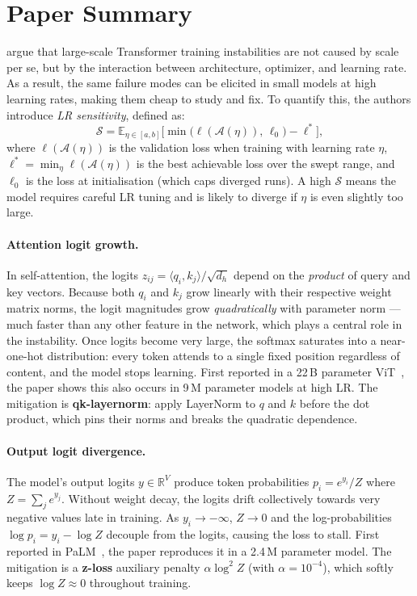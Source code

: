 \section{Paper Summary}
\label{sec:summary}

\citeauthor{wortsman2023smallscale} argue that large-scale Transformer
training instabilities are not caused by scale per se, but by the interaction
between architecture, optimizer, and learning rate.
As a result, the same failure modes can be elicited in small models at high
learning rates, making them cheap to study and fix.
To quantify this, the authors introduce \emph{LR sensitivity}, defined as:
\begin{equation}
  \mathcal{S} = \mathbb{E}_{\eta \in [a,b]}\bigl[
    \min\!\bigl(\ell(\mathcal{A}(\eta)),\, \ell_0\bigr) - \ell^*
  \bigr],
  \label{eq:lr_sensitivity}
\end{equation}
where $\ell(\mathcal{A}(\eta))$ is the validation loss when training with
learning rate $\eta$, $\ell^* = \min_\eta \ell(\mathcal{A}(\eta))$ is the
best achievable loss over the swept range, and $\ell_0$ is the loss at
initialisation (which caps diverged runs).
A high $\mathcal{S}$ means the model requires careful LR tuning and is likely
to diverge if $\eta$ is even slightly too large.

\paragraph{Attention logit growth.}
In self-attention, the logits $z_{ij} = \langle q_i, k_j\rangle / \sqrt{d_h}$
depend on the \emph{product} of query and key vectors.
Because both $q_i$ and $k_j$ grow linearly with their respective weight matrix
norms, the logit magnitudes grow \emph{quadratically} with parameter norm ---
much faster than any other feature in the network, which plays a central role in the instability.
Once logits become very large, the softmax saturates into a near-one-hot
distribution: every token attends to a single fixed position regardless of content, and the
model stops learning.
First reported in a 22\,B parameter ViT~\cite{dehghani2023scaling}, the paper
shows this also occurs in 9\,M parameter models at high LR.
The mitigation is \textbf{qk-layernorm}: apply LayerNorm to $q$ and $k$
before the dot product, which pins their norms and breaks the quadratic
dependence.

\paragraph{Output logit divergence.}
The model's output logits $y \in \mathbb{R}^V$ produce token probabilities
$p_i = e^{y_i}/Z$ where $Z = \sum_j e^{y_j}$.
Without weight decay, the logits drift collectively towards very negative
values late in training.
As $y_i \to -\infty$, $Z \to 0$ and the log-probabilities $\log p_i = y_i -
\log Z$ decouple from the logits, causing the loss to stall.
First reported in PaLM~\cite{chowdhery2022palm}, the paper reproduces it in a
2.4\,M parameter model.
The mitigation is a \textbf{z-loss} auxiliary penalty $\alpha\log^2\!Z$ (with
$\alpha = 10^{-4}$), which softly keeps $\log Z \approx 0$ throughout
training.

